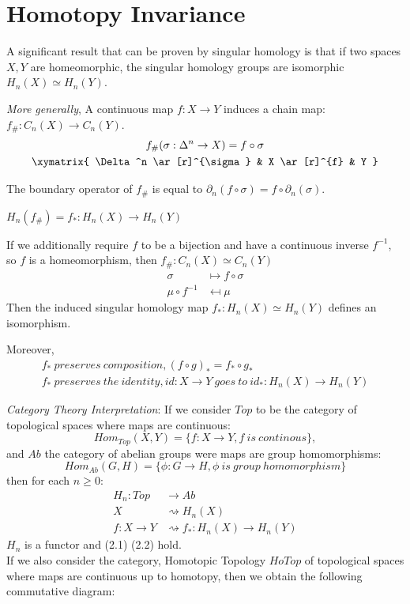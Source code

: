 \documentclass[11pt,a4paper]{report}
\begin{document}
    \section{Homotopy Invariance}

    A significant result that can be proven by singular homology is that if two spaces $X, Y$ are homeomorphic, the singular homology groups are isomorphic $ H_n(X) \simeq H_n(Y)$.

    \emph{More generally},
    A continuous map $f: X \rightarrow Y$ induces a chain map: $f_\#: C_n(X) \rightarrow C_n(Y)$.
    \begin{gather*}
        f_\#(\sigma: \Delta^ n \rightarrow X) = f \circ \sigma \\
                    \xymatrix{
                        \Delta^n  \ar[r]^{\sigma} &
                        X  \ar[r]^{f} & Y  }
    \end{gather*}

    The boundary operator of $f_\#$ is equal to $\partial_n(f \circ \sigma) = f \circ \partial_n(\sigma)$.

    $H_n(f_\#) = f_*: H_n(X) \rightarrow H_n(Y)$ \\

    \par
    If we additionally require $f$ to be a bijection and have a continuous inverse $f^{-1}$, so $f$ is a homeomorphism, then $f_\#: C_n(X) \simeq C_n(Y)$
    \begin{align*}
        \sigma &\mapsto f \circ \sigma \\
        \mu \circ f^{-1} &\mapsfrom \mu
    \end{align*}
    Then the induced singular homology map $f_*: H_n(X) \simeq H_n(Y)$ defines an isomorphism.

    Moreover,
    \begin{gather}
        f_* \ preserves \ composition, (f \circ g)_* = f_* \circ g_* \\
        f_* \ preserves \ the \ identity, id: X \rightarrow Y \ goes \ to \ id_*:  H_n(X) \rightarrow H_n(Y)
    \end{gather}

    \emph{Category Theory Interpretation}: \label{functoriality} If we consider $Top$ to be the category of topological spaces where maps are continuous:
    \[{Hom}_{Top}(X, Y) = \{f: X \rightarrow Y, f \ is \ continous\},\] and $Ab$ the category of abelian groups were maps are group homomorphisms: \[{Hom}_{Ab}(G, H) = \{\phi: G \rightarrow H, \phi \ is \ group \ homomorphism\}\] then for each $n \geq 0$:
     \begin{align*}
        H_n: Top &\rightarrow Ab \\
            X &\rightsquigarrow H_n(X) \\
        f: X \rightarrow Y &\rightsquigarrow f_*:  H_n(X) \rightarrow H_n(Y)
    \end{align*}
    $H_n$ is a functor and (2.1) (2.2) hold.  \\
    If we also consider the category, Homotopic Topology $HoTop$ of topological spaces where maps are continuous up to homotopy, then we obtain the following commutative diagram:
\end{document}
